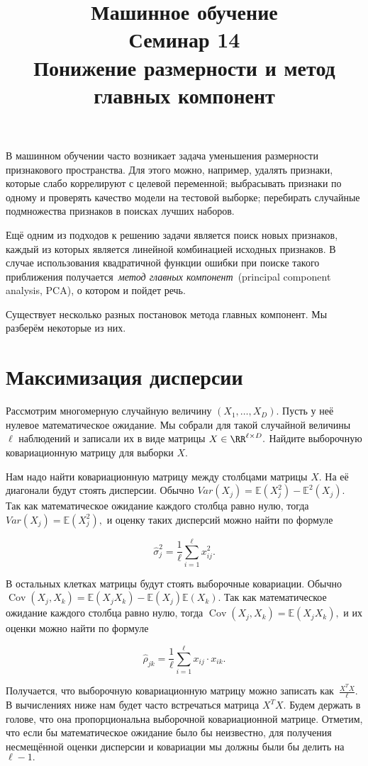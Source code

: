 \documentclass[12pt,fleqn]{article}
\title{Машинное обучение\\Семинар 14\\Понижение размерности и метод главных компонент}
\author{}
\date{}
\DeclareMathOperator{\Cov}{Cov}
\def \E{\mathbb{E}}
\begin{document}
\maketitle

В машинном обучении часто возникает задача уменьшения размерности признакового пространства. Для этого можно, например, удалять признаки, которые слабо коррелируют с целевой переменной; выбрасывать признаки по одному и проверять качество модели на тестовой выборке; перебирать случайные подмножества признаков в поисках лучших наборов.

Ещё одним из подходов к решению задачи является поиск новых признаков, каждый из которых является линейной комбинацией исходных признаков. В случае использования квадратичной функции ошибки при поиске такого приближения получается~\emph{метод главных компонент}~(principal component analysis, PCA), о котором и пойдет речь. 

Существует несколько разных постановок метода главных компонент. Мы разберём некоторые из них. 


\section{Максимизация дисперсии}

\begin{vkProblem} Рассмотрим многомерную случайную величину $(X_1, \ldots, X_D).$  Пусть у неё нулевое математическое ожидание. Мы собрали для такой случайной величины $\ell$ наблюдений и записали их в виде матрицы $X \in \RR^{\ell \times D}.$ Найдите выборочную ковариационную матрицу для выборки $X$.
\end{vkProblem}
\begin{esSolution}
Нам надо найти ковариационную матрицу между столбцами матрицы $X$. На её диагонали будут стоять дисперсии. Обычно $Var(X_j) = \E(X_j^2) - \E^2(X_j).$ Так как математическое ожидание каждого столбца равно нулю, тогда $Var(X_j) = \E(X_j^2),$ и оценку таких дисперсий можно найти по формуле

\[
\hat{\sigma}^2_j = \frac{1}{\ell} \sum_{i=1}^{\ell} x_{ij}^2.
\]

В остальных клетках матрицы будут стоять выборочные ковариации. Обычно $\Cov(X_j, X_k) = \E(X_j X_k) - \E(X_j) \E(X_k).$ Так как математическое ожидание каждого столбца равно нулю, тогда $\Cov(X_j, X_k) = \E(X_j X_k),$ и их оценки можно найти по формуле

\[
\hat{\rho}_{jk} = \frac{1}{\ell} \sum_{i=1}^{\ell} x_{ij}\cdot x_{ik}.
\]

Получается, что выборочную ковариационную матрицу можно записать как~$\frac{X^TX}{\ell}.$ В вычислениях ниже нам будет часто встречаться матрица $X^TX.$ Будем держать в голове, что она пропорциональна выборочной ковариационной матрице. Отметим, что если бы математическое ожидание было бы неизвестно, для получения несмещённой оценки дисперсии и ковариации мы должны были бы делить на $\ell - 1.$
\end{esSolution}
\end{document}
